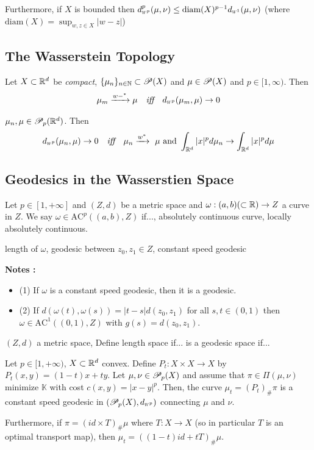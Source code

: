\documentclass[10pt,a4paper]{article}
\renewenvironment{i}
{\begin{itemize} 
	}%
	{\end{itemize}
}
\begin{document}
\quad Furthermore, if $X$ is bounded then $\wa{p}^p (\mu, \nu) \leq \text{diam}(X)^{p-1} \wa{1}(\mu, \nu)$ (where $\text{diam}(X) = \sup_{w, z\in X} |w-z|$)

\subsection{The Wasserstein Topology}

 Let $X\subset \mathbb{R}^d$ be \emph{compact}, $\{\mu_n\}_{n\in \mathbb{N}} \subset \mathscr{P}(X)$ and $\mu\in \mathscr{P}(X)$ and $p\in [1, \infty)$. Then
\begin{align*}
\mu_m \xrightarrow{w-^*} \mu \quad \emph{iff} \quad \wa{p}(\mu_m, \mu) \rightarrow 0
\end{align*}
\s

 $\mu_n, \mu \in \mathscr{P}_p(\mathbb{R}^d)$. Then 
\begin{align*}
\wa{p}(\mu_n, \mu) \rightarrow 0 \quad \emph{iff} \quad \mu_n \xrightarrow{w^*} \,\, \mu\text{ and }\int_{\reals^d} |x|^p d\mu_n \rightarrow \int_{\reals^d} |x|^p d\mu
\end{align*}

\subsection{Geodesics in the Wasserstien Space}

 Let $p\in [1, +\infty]$ and $(Z, d)$ be a metric space and $\omega: (a,b)(\subset \mathbb{R}) \rightarrow Z$ a curve in $Z$. We say $\omega \in \text{AC}^p((a,b),Z)$ if..., absolutely continuous curve, locally absolutely continuous.
\s

 length of $\omega$, geodesic between $z_0,z_1\in Z$, constant speed geodesic
\s

\textbf{Notes :}
\begin{i}
\item[(1)] If $\omega$ is a constant speed geodesic, then it is a geodesic.
\item[(2)] If $d(\omega(t), \omega(s)) = |t-s| d(z_0, z_1)$ for all $s, t\in (0,1)$ then $\omega \in \text{AC}^1((0, 1),Z)$ with $g(s) = d(z_0, z_1)$.
\end{i}
\s

 $(Z, d)$ a metric space, Define length space if... is a geodesic space if...
\s

 Let $p\in [1, +\infty)$, $X\subset \mathbb{R}^d$ convex. Define $P_t : X\times X \rightarrow X$ by $P_t(x,y) = (1-t) x+ty$. Let $\mu, \nu \in \mathscr{P}_p(X)$ and assume that $\pi \in \Pi(\mu, \nu)$ minimize $\mathbb{K}$ with cost $c(x,y) = |x-y|^p$. Then, the curve $\mu_t = (P_t)_{\#} \pi$ is a constant speed geodesic in $(\PP_p(X), \wa{p})$ connecting $\mu$ and $\nu$.

\quad Furthermore, if $\pi = (id \times T)_{\#} \mu$ where $T:X\rightarrow X$ (so in particular $T$ is an optimal transport map), then $\mu_t = ((1-t)id + tT)_{\#} \mu$.
\end{document}
